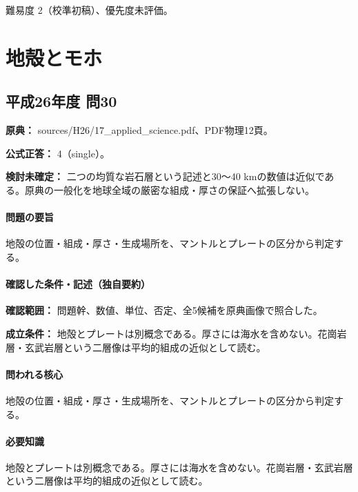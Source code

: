 \par 難易度 2（校準初稿）、優先度未評価。

\section{地殻とモホ}

\subsection{平成26年度 問30}
\label{q:h26-reg-applied-30}

\noindent\textbf{原典：} sources/H26/17\_applied\_science.pdf、PDF物理12頁。

\textbf{公式正答：} 4（single）。

\par\textbf{検討未確定：} 二つの均質な岩石層という記述と30〜40 kmの数値は近似である。原典の一般化を地球全域の厳密な組成・厚さの保証へ拡張しない。

\paragraph{問題の要旨} 地殻の位置・組成・厚さ・生成場所を、マントルとプレートの区分から判定する。

\paragraph{確認した条件・記述（独自要約）}\mbox{}\par

\noindent\textbf{確認範囲：} 問題幹、数値、単位、否定、全5候補を原典画像で照合した。\par

\noindent\textbf{成立条件：} 地殻とプレートは別概念である。厚さには海水を含めない。花崗岩層・玄武岩層という二層像は平均的組成の近似として読む。\par

\paragraph{問われる核心} 地殻の位置・組成・厚さ・生成場所を、マントルとプレートの区分から判定する。

\paragraph{必要知識} 地殻とプレートは別概念である。厚さには海水を含めない。花崗岩層・玄武岩層という二層像は平均的組成の近似として読む。

